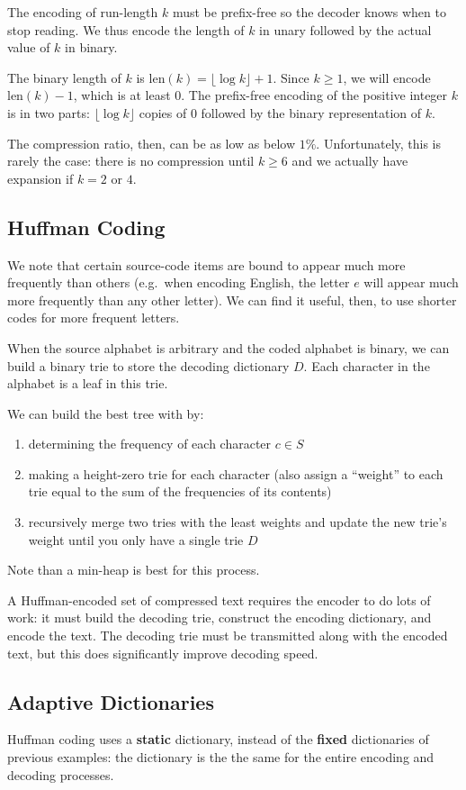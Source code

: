 \documentclass[12pt]{article}
\begin{document}
The encoding of run-length $k$ must be prefix-free so the decoder knows when to stop reading. We thus encode the length of $k$ in unary followed by the actual value of $k$ in binary.

The binary length of $k$ is $\text{len}(k) = \lfloor \log k\rfloor + 1$. Since $k \geq 1$, we will encode $\text{len}(k) − 1$, which is at least 0. The prefix-free encoding of the positive integer $k$ is in two parts: $\lfloor\log k\rfloor$ copies of 0 followed by the binary representation of $k$.

The compression ratio, then, can be as low as below $1\%$. Unfortunately, this is rarely the case: there is no compression until $k \geq 6$ and we actually have expansion if $k = 2$ or $4$.

\subsection{Huffman Coding}
We note that certain source-code items are bound to appear much more frequently than others (e.g.\ when encoding English, the letter $e$ will appear much more frequently than any other letter). We can find it useful, then, to use shorter codes for more frequent letters.

When the source alphabet is arbitrary and the coded alphabet is binary, we can build a binary trie to store the decoding dictionary $D$. Each character in the alphabet is a leaf in this trie.

We can build the best tree with by:
\begin{enumerate}
\item determining the frequency of each character $c \in S$
\item making a height-zero trie for each character (also assign a ``weight'' to each trie equal to the sum of the frequencies of its contents)
\item recursively merge two tries with the least weights and update the new trie's weight until you only have a single trie $D$
\end{enumerate}
Note than a min-heap is best for this process.

A Huffman-encoded set of compressed text requires the encoder to do lots of work: it must build the decoding trie, construct the encoding dictionary, and encode the text. The decoding trie must be transmitted along with the encoded text, but this does significantly improve decoding speed.

\subsection{Adaptive Dictionaries}
Huffman coding uses a {\bf static} dictionary, instead of the {\bf fixed} dictionaries of previous examples: the dictionary is the the same for the entire encoding and decoding processes.
\end{document}
